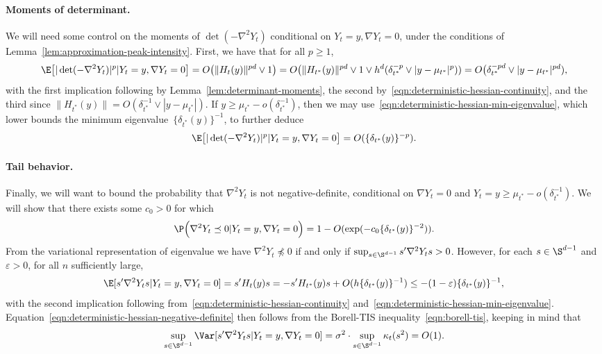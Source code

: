\documentclass{article}
\begin{document}
	\paragraph{Moments of determinant.}
	We will need some control on the moments of $\det(-\nabla^2 Y_{t})$ conditional on $Y_{t} = y, \nabla Y_{t} = 0$, under the conditions of Lemma~\ref{lem:approximation-peak-intensity}. First, we have that for all $p \geq 1$, 
	\begin{equation}
		\label{eqn:deterministic-hessian-determinant-moments}
		\E\big[|\det(-\nabla^2 Y_t)|^p|Y_t = y,\nabla Y_t = 0\big] = O\big(\|H_t(y)\|^{pd} \vee 1\big) = O\big(\|H_{t^*}(y)\|^{pd} \vee 1 \vee h^{d}(\delta_{t^*}^{-p} \vee |y - \mu_{t^*}|^p)) = O\big(\delta_{t^*}^{-pd} \vee |y - \mu_{t^*}|^{pd}),
	\end{equation}
	with the first implication following by Lemma~\ref{lem:determinant-moments}, the second by~\eqref{eqn:deterministic-hessian-continuity}, and the third since $\|H_{t^*}(y)\| = O(\delta_{t^*}^{-1} \vee |y - \mu_{t^*}|)$. If $y \geq \mu_{t^*} - o(\delta_{t^*}^{-1})$, then we may use~\eqref{eqn:deterministic-hessian-min-eigenvalue}, which lower bounds the minimum eigenvalue~$\{\delta_{t^*}(y)\}^{-1}$, to further deduce
	\begin{equation*}
		\label{eqn:deterministic-hessian-determinant-moments-2}
		\E\big[|\det(-\nabla^2 Y_t)|^p|Y_t = y,\nabla Y_t = 0\big] = O(\{\delta_{t^*}(y)\}^{-p}).
	\end{equation*}
	\paragraph{Tail behavior.}
	Finally, we will want to bound the probability that $\nabla^2 Y_t$ is not negative-definite, conditional on $\nabla Y_t = 0$ and $Y_t = y \geq \mu_{t^*} - o(\delta_{t^*}^{-1})$. We will show that there exists some $c_0 > 0$ for which
	\begin{equation}
		\label{eqn:deterministic-hessian-negative-definite}
		\P\Big(\nabla^2 Y_t \preceq 0|Y_t = y,\nabla Y_t = 0\Big) = 1 - O(\exp(-c_0\{\delta_{t^*}(y)\}^{-2})).
	\end{equation}
	From the variational representation of eigenvalue we have $\nabla^2 Y_t \not\preceq 0$ if and only if $\sup_{s \in \S^{d - 1}} s'\nabla^2 Y_ts > 0$. However, for each $s \in \S^{d - 1}$ and $\varepsilon > 0$, for all $n$ sufficiently large,
	\begin{equation}
		\E[s'\nabla^2 Y_t s|Y_t = y,\nabla Y_t = 0] = s'H_t(y)s = -s' H_{t^*}(y)s + O(h\{\delta_{t^*}(y)\}^{-1}) \leq -(1 - \varepsilon)\{\delta_{t^*}(y)\}^{-1},
	\end{equation}
	with the second implication following from~\eqref{eqn:deterministic-hessian-continuity} and~\eqref{eqn:deterministic-hessian-min-eigenvalue}. Equation~\eqref{eqn:deterministic-hessian-negative-definite} then follows from the Borell-TIS inequality~\eqref{eqn:borell-tis}, keeping in mind that 
	$$
	\sup_{s \in \S^{d - 1}} \Var[s'\nabla^2 Y_t s|Y_t = y,\nabla Y_t = 0] = \sigma^2 \cdot \sup_{s \in \S^{d - 1}}\kappa_{t}(s^2) = O(1).
	$$
	
\end{document}
